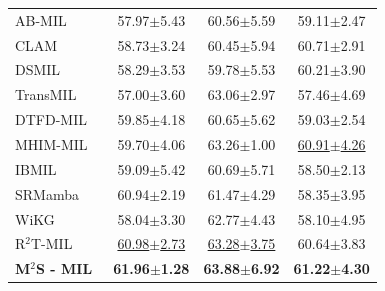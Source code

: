 {\begin{xltabular}{\textwidth}{XCCC}
  AB-MIL~\cite{ilse2018attention}& 57.97$\pm$5.43 & 60.56$\pm$5.59 & 59.11$\pm$2.47 \\
  CLAM~\cite{lu2021data}& 58.73$\pm$3.24 & 60.45$\pm$5.94 & 60.71$\pm$2.91\\
  DSMIL ~\cite{li2021dual} & 58.29$\pm$3.53 & 59.78$\pm$5.53 & 60.21$\pm$3.90  \\
  TransMIL~\cite{shao2021transmil} & 57.00$\pm$3.60 & 63.06$\pm$2.97 & 57.46$\pm$4.69\\
  DTFD-MIL~\cite{zhang2022dtfd} & 59.85$\pm$4.18 & 60.65$\pm$5.62 & 59.03$\pm$2.54\\
  MHIM-MIL ~\cite{tang2023multiple} & 59.70$\pm$4.06 & 63.26$\pm$1.00 & \underline{60.91$\pm$4.26}\\
  IBMIL~\cite{lin2023interventional} & 59.09$\pm$5.42 & 60.69$\pm$5.71 & 58.50$\pm$2.13\\
  SRMamba ~\cite{yang2024mambamil} & 60.94$\pm$2.19 & 61.47$\pm$4.29 & 58.35$\pm$3.95\\
  WiKG ~\cite{li2024dynamic} & 58.04$\pm$3.30 & 62.77$\pm$4.43 & 58.10$\pm$4.95 \\
  R$^2$T-MIL ~\cite{tang2024feature} & \underline{60.98$\pm$2.73} & \underline{63.28$\pm$3.75} & 60.64$\pm$3.83 \\
  \textbf{M$^2$S - MIL} & \textbf{61.96$\pm$1.28} & \textbf{63.88$\pm$6.92} & \textbf{61.22$\pm$4.30}\\
\end{xltabular}}


